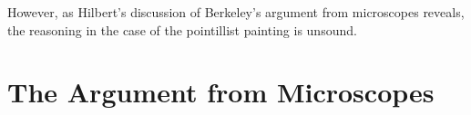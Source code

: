 \documentclass[12pt]{article}
\begin{document}
However, as Hilbert's \citeyear{Hilbert:1987jq} discussion of Berkeley's \citeyear{Berkeley:1734fk} argument from microscopes reveals, the reasoning in the case of the pointillist painting is unsound.


\section{The Argument from Microscopes}\label{sub:the_argument_from_microscopes} %

\end{document}
